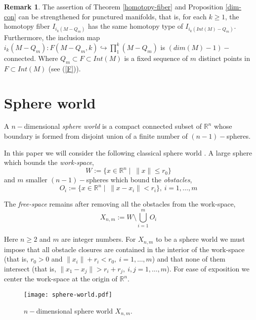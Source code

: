 \documentclass{amsart}
\theoremstyle{definition}
\newtheorem{rem}[thm]{Remark}
\numberwithin{equation}{section}
\begin{document}
\begin{rem}
The assertion of Theorem \ref{homotopy-fiber} and Proposition \ref{dim-con} can be strengthened for punctured manifolds, that is,  for each $k\geq 1$, the homotopy fiber $I_{i_k(M-Q_m)}$ has the same homotopy type of  $I_{i_k(Int(M)-Q_m)}$. Furthermore, the inclusion map $i_k(M-Q_m):F(M-Q_m,k)\hookrightarrow \prod_{1}^{k} (M-Q_m)$ is $(dim(M)-1)-$connected. Where $Q_m\subset F\subset Int(M)$ is a fixed sequence of $m$ distinct points in $F\subset Int(M)$ (see (\ref{F})).
\end{rem}



\section{\bf Sphere world}

A $n-$dimensional \textit{sphere world} \cite{koditschek1990robot} is a compact connected subset of  $\mathbb{R}^n$ %
whose boundary is formed from disjoint union of a finite number of $(n-1)-$spheres. 

In this paper we will consider the following classical sphere world \cite{koditschek1990robot}. A large sphere which bounds the \textit{work-space}, \begin{equation}
W:=\{x\in \mathbb{R}^n\mid~\| x\|\leq r_0\}
\end{equation} and $m$ smaller $(n-1)-$spheres which bound the \textit{obstacles},
\begin{equation}
O_i:=\{x\in\mathbb{R}^n\mid~\|x-x_i\|< r_i\},~i=1,\ldots,m
\end{equation}

The \textit{free-space} remains after removing all the obstacles from the work-space,
\begin{equation}
X_{n,m}:=W\setminus \bigcup_{i=1}^{m}O_i
\end{equation}

Here $n\geq 2$ and $m$ are integer numbers. For $X_{n,m}$ to be a sphere world we must impose that all obstacle closures are contained in the interior of the work-space (that is, $r_0>0$ and $\|x_i\|+r_i<r_0,~i=1,\ldots,m$) and that none of them intersect (that is, $\|x_1-x_j\|>r_i+r_j,~i,j=1,\ldots,m$). For ease of exposition we center the work-space at the origin of $\mathbb{R}^n$.

\begin{figure}[!h]
\caption{$n-$dimensional sphere world $X_{n,m}$.}
 \label{n-dimesional-sphere-world}
 \centering
 \texttt{[image: sphere-world.pdf]}
\end{figure}
\end{document}
